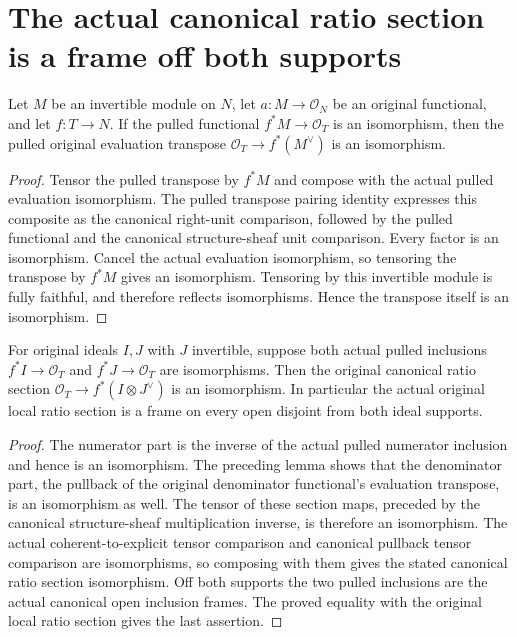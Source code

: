 \section{The actual canonical ratio section is a frame off both supports}

\begin{lemma}
\label{lem:original-pulled-transpose-frame}
\leanok
Let $M$ be an invertible module on $N$, let
$a:M\to\mathcal O_N$ be an original functional, and let $f:T\to N$.
If the pulled functional $f^*M\to\mathcal O_T$ is an isomorphism,
then the pulled original evaluation transpose
$\mathcal O_T\to f^*(M^\vee)$ is an isomorphism.
\end{lemma}
\begin{proof}
Tensor the pulled transpose by $f^*M$ and compose with the actual
pulled evaluation isomorphism. The pulled transpose pairing identity
expresses this composite as the canonical right-unit comparison,
followed by the pulled functional and the canonical structure-sheaf
unit comparison. Every factor is an isomorphism. Cancel the actual
evaluation isomorphism, so tensoring the transpose by $f^*M$ gives
an isomorphism. Tensoring by this invertible module is fully faithful,
and therefore reflects isomorphisms. Hence the transpose itself is
an isomorphism.
\end{proof}

\begin{theorem}
\label{thm:original-canonical-ratio-section-frame}
\leanok
For original ideals $I,J$ with $J$ invertible, suppose both actual
pulled inclusions $f^*I\to\mathcal O_T$ and
$f^*J\to\mathcal O_T$ are isomorphisms. Then the original canonical
ratio section $\mathcal O_T\to f^*(I\otimes J^\vee)$ is an
isomorphism. In particular the actual original local ratio section
is a frame on every open disjoint from both ideal supports.
\end{theorem}
\begin{proof}
The numerator part is the inverse of the actual pulled numerator
inclusion and hence is an isomorphism. The preceding lemma shows
that the denominator part, the pullback of the original denominator
functional's evaluation transpose, is an isomorphism as well.
The tensor of these section maps, preceded by the canonical
structure-sheaf multiplication inverse, is therefore an isomorphism.
The actual coherent-to-explicit tensor comparison and canonical
pullback tensor comparison are isomorphisms, so composing with
them gives the stated canonical ratio section isomorphism. Off
both supports the two pulled inclusions are the actual canonical
open inclusion frames. The proved equality with the
original local ratio section gives the last assertion.
\end{proof}
